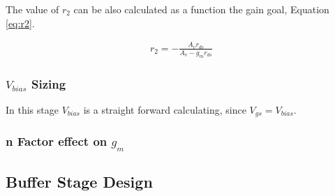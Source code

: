 The value of $r_2$ can be also calculated as a function the gain goal, Equation \ref{eq:r2}. 

\begin{equation}
    \begin{split}
        r_{2} = - \frac{A_{v} r_{ds}}{A_{v} - g_{m} r_{ds}}
    \end{split}
    \label{eq:r2}
\end{equation}


\subsubsection{$V_{bias}$ Sizing}


In this stage $V_{bias}$ is a straight forward calculating, since $V_{gs} = V_{bias}$.

\subsubsection{n Factor effect on $g_m$}

\subsection{Buffer Stage Design}